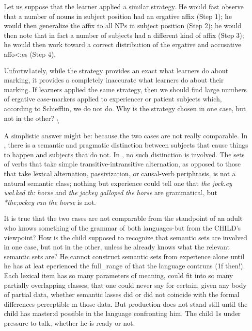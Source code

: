 Let us suppose that the  learner applied a similar strategy. He would fast observe that a number of nouns in subject position had an ergative affix (Step 1); he would then generalize the affix to all NPs in subject position (Step 2); he would then note that in fact a number of subjects had a different kind of affix (Step 3); he would then work toward a correct distribution of the ergative and accusative affo{\textless}:es (Step 4).

Unfortw1ately, while the  strategy provides an exact  what  learners do about  marking, it provides a completely inaccurate  what  learners do about their  marking. If  learners applied the same strategy, then we should find large numbers of ergative case-markers applied to experiencer or patient subjects which, according to Schief\-flin, we do not do. Why is the  strategy chosen in one case, but not in the other? \textsubscript{{\textbackslash}}


A simplistic answer might be: because the two cases are not really comparable. In , there is a semantic and pragmatic distinc\-tion between subjects that cause things to happen and subjects that do not. In , no such distinction is involved. The sets of verbs that take simple transitive-intransitive alternation, as opposed to those that take lexical alternation, passivization, or causal-verb periphrasis, is not a natural semantic class; nothing but experience could tell one that \textit{the} \textit{jock.}\textit{ey} \textit{wal.ked} \textit{th}\textit{:} \textit{horse} and \textit{the} \textit{jockey} \textit{galloped} \textit{the} \textit{horse} are gram\-matical, but \textit{*the;ockey} \textit{ran} \textit{the} \textit{horse} is not.

It is true that the two cases are not comparable from the stand\-point of an adult who knows something of the grammar of both lan\-guages-but from the CHILD's viewpoint? How is the child supposed to recognize that semantic sets are involved in one case, but not in the other, unless he already knows what the relevant semantic sets are? He cannot construct semantic sets from experience alone until he has at leat eperienced the full\_range of  that the language contruns (1f then!). Each lexical item has so many parameters of mean\-ing, could fit into so many partially overlapping classes, that one could never say for certain, given any body of partial data, whether semantic lasses did or did not coincide with the formal differences perceptible m those data. But production does not stand still until the child has master:d possible  in the language confronting him. The child 1s under pressure to talk, whether he is ready or not.

